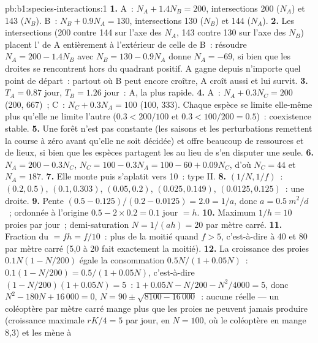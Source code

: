 \begin{solution}{pb:b1:species-interactions:1}
\textbf{1.} A~: $N_A + 1.4 N_B = 200$, intersections 200 ($N_A$) et 143
($N_B$). B~: $N_B + 0.9 N_A = 130$, intersections 130 ($N_B$) et 144
($N_A$).
\textbf{2.} Les intersections (200 contre 144 sur l'axe des $N_A$, 143
contre 130 sur l'axe des $N_B$) placent l' de A entièrement à
l'extérieur de celle de B~: résoudre $N_A = 200 - 1.4 N_B$ avec
$N_B = 130 - 0.9 N_A$ donne $N_A = -69$, si bien que les droites se
rencontrent hors du quadrant positif. A gagne depuis n'importe quel
point de départ~: partout où B peut encore croître, A croît aussi et lui
survit.
\textbf{3.} $T_A = 0.87$ jour, $T_B = 1.26$ jour~: A, la plus rapide.
\textbf{4.} A~: $N_A + 0.3 N_C = 200$ (200, 667)~; C~: $N_C + 0.3 N_A =
100$ (100, 333). Chaque espèce se limite elle-même plus qu'elle ne
limite l'autre ($0.3 < 200/100$ et $0.3 < 100/200 = 0.5$)~:
coexistence stable.
\textbf{5.} Une forêt n'est pas constante (les saisons et les
perturbations remettent la course à zéro avant qu'elle ne soit décidée)
et offre beaucoup de ressources et de lieux, si bien que les espèces
partagent les  au lieu de s'en disputer une seule.
\textbf{6.} $N_A = 200 - 0.3 N_C$, $N_C = 100 - 0.3 N_A = 100 - 60 +
0.09 N_C$, d'où $N_C = 44$ et $N_A = 187$.
\textbf{7.} Elle monte puis s'aplatit vers 10~: type II.
\textbf{8.} $(1/N, 1/f)$~: $(0.2, 0.5)$, $(0.1, 0.303)$, $(0.05, 0.2)$,
$(0.025, 0.149)$, $(0.0125, 0.125)$~: une droite.
\textbf{9.} Pente $(0.5 - 0.125)/(0.2 - 0.0125) = 2.0 = 1/a$, donc $a =
\qty{0.5}{m^2/d}$~; ordonnée à l'origine $0.5 - 2\times 0.2 = 0.1$ jour $= h$.
\textbf{10.} Maximum $1/h = 10$ proies par jour~; demi-saturation $N =
1/(ah) = 20$ par mètre carré.
\textbf{11.} Fraction du  $= f h = f/10$~: plus de
la moitié quand $f
> 5$, c'est-à-dire à 40 et 80 par mètre carré (5,0 à 20 fait exactement
la moitié).
\textbf{12.} La croissance des proies $0.1 N (1 - N/200)$ égale la
consommation
$0.5N/(1 + 0.05N)$~: $0.1(1 - N/200) = 0.5/(1 + 0.05 N)$, c'est-à-dire
$(1 - N/200)(1 + 0.05N) = 5$~: $1 + 0.05N - N/200 - N^2/4000 = 5$, donc
$N^2 - 180 N + 16\,000 = 0$, $N = 90 \pm \sqrt{8100 - 16\,000}$~: aucune
 réelle --- un coléoptère par mètre carré mange plus que les
proies ne peuvent jamais produire (croissance maximale $rK/4 = 5$ par
jour, en $N = 100$, où le coléoptère en mange 8,3) et les mène à

\end{solution}
